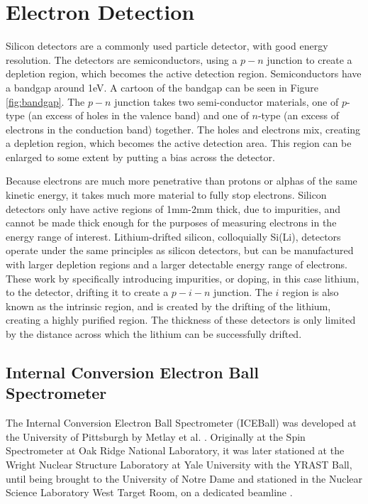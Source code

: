 

\section{Electron Detection}

Silicon detectors are a commonly used particle detector, with good energy resolution. The detectors are semiconductors, using a $p-n$ junction to create a depletion region, which becomes the active detection region\citep{knoll00:rad_det_meas}. Semiconductors have a bandgap around 1eV. A cartoon of the bandgap can be seen in Figure \ref{fig:bandgap}. The $p-n$ junction takes two semi-conductor materials, one of $p$-type (an excess of holes in the valence band) and one of $n$-type (an excess of electrons in the conduction band) together. The holes and electrons mix, creating a depletion region, which becomes the active detection area. This region can be enlarged to some extent by putting a bias across the detector.



Because electrons are much more penetrative than protons or alphas of the same kinetic energy, it takes much more material to fully stop electrons. Silicon detectors only have active regions of 1mm-2mm thick, due to impurities, and cannot be made thick enough for the purposes of measuring electrons in the energy range of interest. Lithium-drifted silicon, colloquially Si(Li), detectors operate under the same principles as silicon detectors, but can be manufactured with larger depletion regions and a larger detectable energy range of electrons. These work by specifically introducing impurities, or doping, in this case lithium, to the detector, drifting it to create a $p-i-n$ junction. The $i$ region is also known as the intrinsic region, and is created by the drifting of the lithium, creating a highly purified region. The thickness of these detectors is only limited by the distance across which the lithium can be successfully drifted.

\subsection{Internal Conversion Electron Ball Spectrometer}

The Internal Conversion Electron Ball Spectrometer (ICEBall) was developed at the University of Pittsburgh by Metlay et al. \citep{metlay92:_iceball_comm,metlay93:_iceball_comm}. Originally at the Spin Spectrometer at Oak Ridge National Laboratory, it was later stationed at the Wright Nuclear Structure Laboratory at Yale University with the YRAST Ball, until being brought to the University of Notre Dame and stationed in the Nuclear Science Laboratory West Target Room, on a dedicated beamline \citep{battaglia15:_iceball_176lu}.

